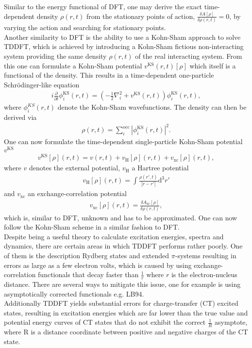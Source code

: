 Similar to the energy functional of DFT, one may derive the exact time-dependent density $\rho(r, t)$ from the stationary points of action, $ \frac{\delta A[\rho]}{\delta \rho(r, t)} = 0$, by varying the action and searching for stationary points.\\
Another similarity to DFT is the ability to use a Kohn-Sham approach to solve TDDFT, which is achieved by introducing a  Kohn-Sham fictious non-interacting system providing the same density $\rho(r, t)$ of the real interacting system. From this one can formulate a Kohn-Sham potential $v^{\mathrm{KS}}(r, t)[\rho]$ which itself is a functional of the density. This results in a time-dependent one-particle Schrödinger-like equation 
\begin{align}
    i\frac{\partial}{\partial t}\phi_i^{\mathrm{KS}}(r, t) = \left(-\frac{1}{2}\nabla_{i}^{2}+v^{\mathrm{KS}}(r, t)\right)\phi_i^{\mathrm{KS}}(r, t),
\end{align}
where $\phi_i^{KS}(r, t)$ denote the Kohn-Sham wavefunctions. The density can then be derived via
\begin{align}
    \rho(r, t) = \sum_{i}^{\mathrm{occ}} |\phi_i^{\mathrm{KS}}(r, t)|^{2}.
\end{align}
One can now formulate the time-dependent single-particle Kohn-Sham potential $v^{\mathrm{KS}}$
\begin{align}
    v^{\mathrm{KS}}[\rho](r, t) = v(r, t) + v_{\mathrm{H}}[\rho](r, t) + v_{\mathrm{xc}}[\rho](r, t)\mathrm{,}
\end{align}
where $v$ denotes the external potential, $v_{\mathrm{H}}$ a Hartree potential
\begin{align}
    v_{\mathrm{H}}[\rho](r, t) = \int \frac{\rho(r', t)}{|r-r'|}\mathrm{d}^3 r'
\end{align}
and $v_{\mathrm{xc}}$ an exchange-correlation potential
\begin{align}
    v_{\mathrm{xc}}[\rho](r, t) = \frac{\delta A_{\mathrm{xc}}[\rho]}{\delta \rho (r, t)}\mathrm{,}
\end{align}
which is, similar to DFT, unknown and has to be approximated.\cite{TDDFT} One can now follow the Kohn-Sham scheme in a similar fashion to DFT.\\
Despite being a useful theory to calculate excitation energies, spectra and dynamics, there are certain areas in which TDDFT performs rather poorly. One of them is the description Rydberg states and extended $\pi$-systems resulting in errors as large as a few electron volts,\cite{DFT_pi_error_1, DFT_pi_error_2} which is caused by using exchange-correlation functionals that decay faster than $\frac{1}{r}$ where $r$ is the electron-nucleus distance. There are several ways to mitigate this issue, one for example is using asymptotically corrected functionals e.g. LB94.\cite{DFT_pi_corr_1} \\
Additionally TDDFT yields substantial errors for charge-transfer (CT) excited states, resulting in excitation energies which are far lower than the true value and potential energy curves of CT states that do not exhibit the correct $\frac{1}{R}$ asymptote, where R is a distance coordinate between positive and negative charges of the CT state.\cite{DFT_CT_error_1, DFT_CT_error_2}


